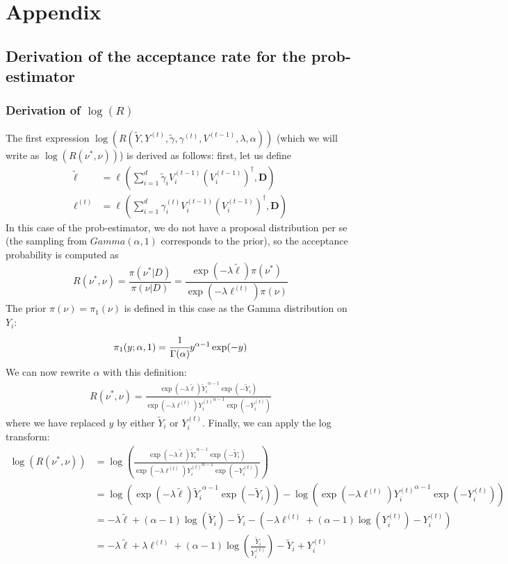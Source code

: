 \documentclass[12pt]{memoir}
\newcommand{\mb}{\mathbf}
\begin{document}
% 
% 
\printbibliography

\chapter*{Appendix}
\section*{Derivation of the acceptance rate for the prob-estimator}\label{section:appendix:acc-rate-prob}

\subsection*{Derivation of $\log(R)$}
The first expression $\log(R(\tilde Y, Y^{(t)}, \tilde \gamma, \gamma^{(t)}, V^{(t-1)}, \lambda, \alpha))$ (which we will write as $\log(R(\nu^*, \nu))$) is derived as follows: first, let us define
\begin{align}
    \tilde \ell &= \ell^{}(\sum_{i=1}^{d} \tilde \gamma_i V_i^{(t-1)} (V_i^{(t-1)})^\dagger, \mb D)\\
    \ell^{(t)} &= \ell^{}(\sum_{i=1}^{d} \gamma_i^{(t)} V_i^{(t-1)} (V_i^{(t-1)})^\dagger, \mb D)
\end{align}
In this case of the prob-estimator, we do not have a proposal distribution per se (the sampling from $Gamma(\alpha, 1)$ corresponds to the prior), so the acceptance probability is computed as
\begin{equation}
    R(\nu^*, \nu) = \frac{\pi(\nu^*|D)}{\pi(\nu|D)} = \frac{\exp(-\lambda \tilde\ell) \pi(\nu^*)}{\exp(-\lambda \ell^{(t)})\pi(\nu)}
\end{equation}
The prior $\pi(\nu) = \pi_1(\nu)$ is defined in this case as the Gamma distribution on $Y_i$:
\begin{equation}
    \pi_1(y;\alpha, 1) = \cfrac{1}{\Gamma(\alpha)}y^{\alpha - 1} \exp(-y)
\end{equation}
We can now rewrite $\alpha$ with this definition:
\begin{align}
    R(\nu^*, \nu) = \frac{\exp(-\lambda \tilde\ell) {\tilde Y_i}^{\alpha - 1} \exp(-\tilde Y_i)}{\exp(-\lambda \ell^{(t)}) {Y_i^{(t)}}^{\alpha - 1} \exp(-Y_i^{(t)})}
\end{align}
where we have replaced $y$ by either $\tilde Y_i$ or $Y^{(t)}_i$. Finally, we can apply the log transform:
\begin{align}
    \log(R(\nu^*, \nu)) &= \log\left(\frac{\exp(-\lambda \tilde\ell) {\tilde Y_i}^{\alpha - 1} \exp(-\tilde Y_i)}{\exp(-\lambda \ell^{(t)}) {Y_i^{(t)}}^{\alpha - 1} \exp(-Y_i^{(t)})}\right)\\
    &= \log(\exp(-\lambda \tilde\ell) {\tilde Y_i}^{\alpha - 1} \exp(-\tilde Y_i)) - \log(\exp(-\lambda \ell^{(t)}) {Y_i^{(t)}}^{\alpha - 1} \exp(-Y_i^{(t)}))\\
    &= -\lambda \tilde \ell + (\alpha - 1)\log(\tilde Y_i) - \tilde Y_i - (-\lambda \ell^{(t)} + (\alpha - 1)\log(Y_i^{(t)}) - Y_i^{(t)})\\
    &= -\lambda \tilde \ell + \lambda \ell^{(t)} + (\alpha -1)\log(\frac{\tilde Y_i}{Y_i^{(t)}}) - \tilde Y_i + Y_i^{(t)}
\end{align}
\end{document}
